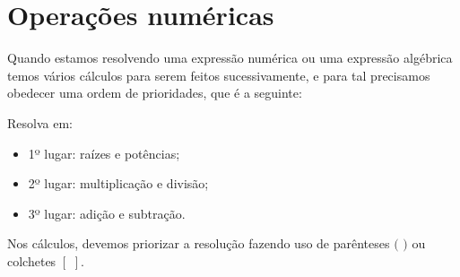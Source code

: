 
\chapter{Operações numéricas}
 Quando estamos resolvendo uma expressão numérica ou uma expressão algébrica temos vários cálculos para serem feitos sucessivamente, e para tal precisamos obedecer uma ordem de prioridades, que é a seguinte:

Resolva em:
\begin{itemize}
\item 1º lugar: raízes e potências;
\item 2º lugar: multiplicação e divisão;
\item 3º lugar: adição e subtração.
\end{itemize}

Nos cálculos, devemos priorizar a resolução fazendo uso de parênteses $($ $)$ ou colchetes $[ \, \, ]$.




